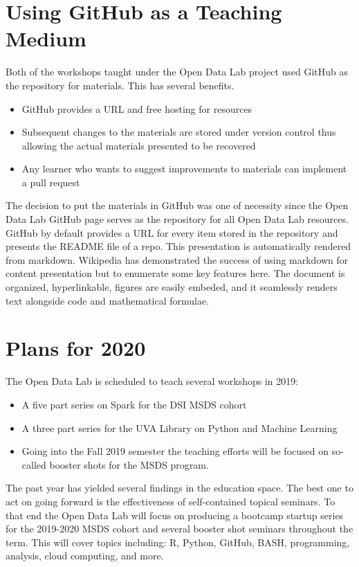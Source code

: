 \section{Using GitHub as a Teaching Medium}
\label{githubforteaching}
Both of the workshops taught under the Open Data Lab project used GitHub as the repository for materials. This has several benefits.
\begin{itemize}
\item GitHub provides a URL and free hosting for resources
\item Subsequent changes to the materials are stored under version control thus allowing the actual materials presented to be recovered
\item Any learner who wants to suggest improvements to materials can implement a pull request
\end{itemize}

The decision to put the materials in GitHub was one of necessity since the Open Data Lab GitHub page serves as the repository for all Open Data Lab resources. GitHub by default provides a URL for every item stored in the repository and presents the README file of a repo. This presentation is automatically rendered from markdown. Wikipedia has demonstrated the success of using markdown for content presentation but to enumerate some key features here. The document is organized, hyperlinkable, figures are easily embeded, and it seamlessly renders text alongside code and mathematical formulae.

\section{Plans for 2020}
The Open Data Lab is scheduled to teach several workshops in 2019:
\begin{itemize}
\item A five part series on Spark for the DSI MSDS cohort
\item A three part series for the UVA Library on Python and Machine Learning
\item Going into the Fall 2019 semester the teaching efforts will be focused on so-called booster shots for the MSDS program.
\end{itemize}

The past year has yielded several findings in the education space. The best one to act on going forward is the effectiveness of self-contained topical seminars. To that end the Open Data Lab will focus on producing a bootcamp startup series for the 2019-2020 MSDS cohort and several booster shot seminars throughout the  term. This will cover topics including: R, Python, GitHub, BASH, programming, analysis, cloud computing, and more.